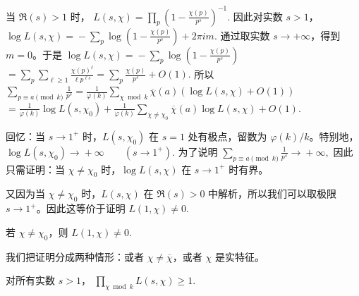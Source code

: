 当 $\Re(s)>1$ 时，
\(\textstyle L(s,\allowbreak{}\chi)=\allowbreak{}\prod_p\left(1-\frac{\chi(p)}{p^s}\right)^{-1}.\)
因此对实数 $s>1$，
\(\textstyle \log L(s,\allowbreak{}\chi) =\allowbreak{} -\sum_p\log\left(1-\frac{\chi(p)}{p^s}\right)+\allowbreak{}2\pi i m.\)
通过取实数 $s\to+\infty$，得到 $m=0$。于是
\(\textstyle \log L(s,\allowbreak{}\chi) =\allowbreak{} -\sum_p\log\left(1-\frac{\chi(p)}{p^s}\right)\) \(\textstyle =\allowbreak{} \sum_p\sum_{\ell\geq\allowbreak{} 1}\frac{\chi(p)^\ell}{\ell p^{\ell s}} =\allowbreak{} \sum_p\frac{\chi(p)}{p^s}+\allowbreak{}O(1).\)
所以
\(\textstyle \sum_{p\equiv\allowbreak{} a\pmod k}\frac{1}{p^s} =\allowbreak{} \frac{1}{\varphi(k)} \sum_{\chi\bmod k}\overline{\chi}(a) \left(\log L(s,\allowbreak{}\chi)+\allowbreak{}O(1)\right)\) \(\textstyle =\allowbreak{} \frac{1}{\varphi(k)}\log L(s,\allowbreak{}\chi_0) +\allowbreak{} \frac{1}{\varphi(k)} \sum_{\chi\neq\allowbreak{}\chi_0}\overline{\chi}(a)\log L(s,\allowbreak{}\chi) +\allowbreak{} O(1).\)

回忆：当 $s\to 1^+$ 时，$L(s,\chi_0)$ 在 $s=1$ 处有极点，留数为 $\varphi(k)/k$。特别地，
\(\textstyle \log L(s,\allowbreak{}\chi_0)\to\allowbreak{}+\allowbreak{}\infty \qquad (s\to\allowbreak{} 1^+\allowbreak{}).\)
为了说明
\(\textstyle \sum_{p\equiv\allowbreak{} a\pmod k}\frac{1}{p^s} \to\allowbreak{}+\allowbreak{}\infty,\allowbreak{}\)
因此只需证明：当 $\chi\neq\chi_0$ 时，$\log L(s,\chi)$ 在 $s\to1^+$ 时有界。

又因为当 $\chi\neq\chi_0$ 时，$L(s,\chi)$ 在 $\Re(s)>0$ 中解析，所以我们可以取极限 $s\to1^+$。因此这等价于证明
\(\textstyle L(1,\allowbreak{}\chi)\neq\allowbreak{} 0.\)

\begin{theorem}
	若 $\chi\neq\chi_0$，则
	\(\textstyle L(1,\allowbreak{}\chi)\neq\allowbreak{} 0.\)
\end{theorem}

我们把证明分成两种情形：或者 $\chi\neq\overline{\chi}$，或者 $\chi$ 是实特征。

\begin{lemma}
	对所有实数 $s>1$，
	\(\textstyle \prod_{\chi\bmod k}L(s,\allowbreak{}\chi)\geq\allowbreak{} 1.\)
\end{lemma}

